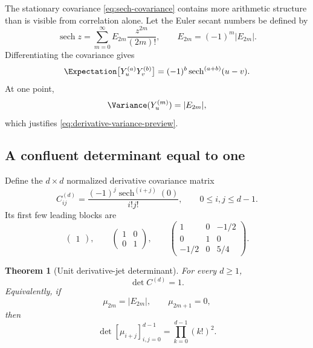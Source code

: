 \documentclass[11pt,a4paper]{article}
\newtheorem{theorem}{Theorem}[section]
\theoremstyle{definition}
\theoremstyle{remark}
\newcommand{\sech}{\operatorname{sech}}
\begin{document}
The stationary covariance \eqref{eq:sech-covariance} contains more arithmetic structure than is visible from correlation alone.  Let the Euler secant numbers be defined by
\begin{equation}
  \sech z=\sum_{m=0}^{\infty}E_{2m}\frac{z^{2m}}{(2m)!},
  \qquad E_{2m}=(-1)^m|E_{2m}|.
  \label{eq:euler-definition}
\end{equation}
Differentiating the covariance gives
\begin{equation}
  \Expectation\bigl[Y_u^{(a)}Y_v^{(b)}\bigr]
   =(-1)^b\sech^{(a+b)}(u-v).
  \label{eq:derivative-covariance}
\end{equation}
At one point,
\begin{equation}
  \Variance(Y_u^{(m)})=|E_{2m}|,
  \label{eq:euler-derivative-variance}
\end{equation}
which justifies \eqref{eq:derivative-variance-preview}.

\subsection{A confluent determinant equal to one}

Define the $d\times d$ normalized derivative covariance matrix
\begin{equation}
  C^{(d)}_{ij}
   =\frac{(-1)^j\sech^{(i+j)}(0)}{i!j!},
  \qquad 0\le i,j\le d-1.
  \label{eq:normalized-derivative-matrix}
\end{equation}
Its first few leading blocks are
\[
 \begin{pmatrix}1\end{pmatrix},\qquad
 \begin{pmatrix}1&0\\0&1\end{pmatrix},\qquad
 \begin{pmatrix}
  1&0&-1/2\\
  0&1&0\\
  -1/2&0&5/4
 \end{pmatrix}.
\]

\begin{theorem}[Unit derivative-jet determinant]
\label{thm:unit-jet-determinant}
For every $d\ge1$,
\begin{equation}
  \boxed{\det C^{(d)}=1.}
  \label{eq:unit-jet-determinant}
\end{equation}
Equivalently, if
\begin{equation}
  \mu_{2m}=|E_{2m}|,
  \qquad \mu_{2m+1}=0,
  \label{eq:sech-moments}
\end{equation}
then
\begin{equation}
  \boxed{
  \det[\mu_{i+j}]_{i,j=0}^{d-1}
    =\prod_{k=0}^{d-1}(k!)^2.}
  \label{eq:euler-hankel-determinant}
\end{equation}
\end{theorem}
\end{document}

